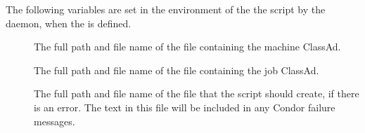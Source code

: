 The following variables are set in the environment of the
the  script by the 
daemon, when the  is defined.
\begin{description}
\item[
]
  The full path and file name of the file containing the machine ClassAd.
\item[
]
  The full path and file name of the file containing the job ClassAd.
\item[
]
  The full path and file name of the file that the 
  script should create, if there is an error.
  The text in this file will be included in any Condor failure messages. 
\end{description}

